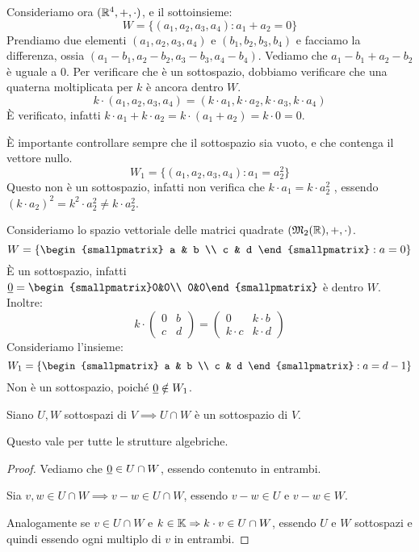 Consideriamo ora $(\mathbb{R}^4, +, \cdot)$, e il sottoinsieme:
\[
W = \{ (a_1, a_2, a_3, a_4) : a_1 + a_2 = 0 \}
\]
Prendiamo due elementi $(a_1, a_2, a_3, a_4)$ e $(b_1, b_2, b_3, b_4)$ e facciamo la differenza, ossia $(a_1 - b_1, a_2 - b_2, a_3 - b_3, a_4 - b_4)$. Vediamo che $a_1 - b_1 + a_2 - b_2$ \`e uguale a 0. Per verificare che \`e un sottospazio, dobbiamo verificare che una quaterna moltiplicata per $k$ \`e ancora dentro $W$.
\[
k \cdot (a_1, a_2, a_3, a_4) = (k \cdot a_1, k \cdot a_2, k \cdot a_3, k \cdot a_4)
\]
\`E verificato, infatti $k \cdot a_1 + k \cdot a_2 = k \cdot (a_1 + a_2) = k \cdot 0 = 0$.

\`E importante controllare sempre che il sottospazio sia vuoto, e che contenga il vettore nullo.
\[
W_1 = \{ (a_1, a_2, a_3, a_4) : a_1 = a_2^2 \}
\]
Questo non \`e un sottospazio, infatti non verifica che $k \cdot a_1 = k \cdot a_2^2$ , essendo $(k \cdot a_2)^2 = k^2 \cdot a_2^2 \neq k \cdot a_2^2$.

Consideriamo lo spazio vettoriale delle matrici quadrate $(\mathfrak{M}_2 (\mathbb{R}), +, \cdot)$.
\[
W = \left\{ 
\begin{smallpmatrix}
a & b  \\
c & d 
\end{smallpmatrix}
: a = 0 \right\}
\]
\`E un sottospazio, infatti $\nullelement = \begin{smallpmatrix}0&0\\ 0&0\end{smallpmatrix} $ \`e dentro $W$. Inoltre:
\[
k \cdot 
\begin{pmatrix}
0 & b \\
c & d
\end{pmatrix}
=
\begin{pmatrix}
0 & k \cdot b \\ 
k \cdot c & k \cdot d
\end{pmatrix}
\]
Consideriamo l'insieme:
\[
W_1 = \left\{
\begin{smallpmatrix}
a & b \\
c & d 
\end{smallpmatrix}
: a = d - 1 \right\} 
\]
Non \`e un sottospazio, poich\'e $\underline{0} \notin W_1$.

\begin{prop}
Siano $U, W$ sottospazi di $V \implies U \cap W$ \`e un sottospazio di $V$.
\end{prop}
Questo vale per tutte le strutture algebriche.

\begin{proof}
Vediamo che $\underline{0} \in U \cap W$, essendo contenuto in entrambi.

Sia $v, w \in U \cap W \implies v - w \in U \cap W$, essendo $v - w \in U$ e $v - w \in W$.

Analogamente se $v \in U \cap W$ e $k \in \mathbb{K} \Rightarrow k \cdot v \in U \cap W$, essendo $U$ e $W$ sottospazi e quindi essendo ogni multiplo di $v$ in entrambi.
\end{proof}

